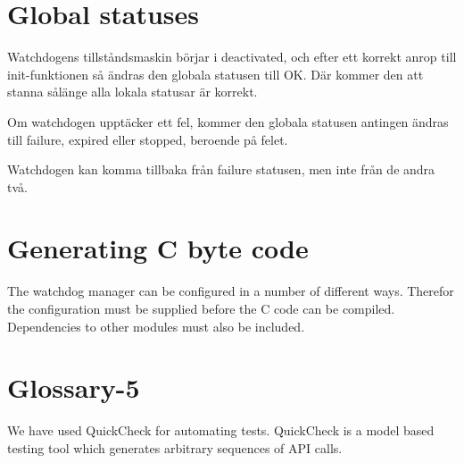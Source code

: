 \documentclass[a4paper]{article}
\begin{document}


\section{Global statuses}
Watchdogens tillståndsmaskin börjar i deactivated, och efter ett
korrekt anrop till init-funktionen så ändras den globala statusen till
OK.
Där kommer den att stanna sålänge alla lokala statusar är korrekt.

Om watchdogen upptäcker ett fel, kommer den globala statusen
antingen ändras till failure, expired eller stopped, beroende på
felet.

Watchdogen kan komma tillbaka från failure statusen, men inte från de
andra två.







\section{Generating C byte code}
The watchdog manager can be configured in a number of different
ways. Therefor the configuration must be supplied before the C code
can be compiled. Dependencies to other modules must also be included.

\section{Glossary-5}
We have used QuickCheck for automating tests. QuickCheck is a model
based testing tool which generates arbitrary sequences of API calls.
\end{document}

